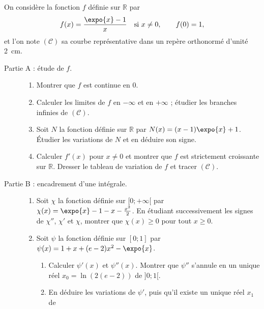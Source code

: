 \begin{exo}
\label{exo:pb exp moins un sur x}
      On consid\`ere la fonction $f$ d\'efinie sur $\mathbb{R}$ par
      \[
            f(x) = \frac{\expo{x} - 1}{x} \quad \text{si } x \neq 0, \qquad f(0) = 1 ,
      \]
      et l'on note $(\mathscr{C})$ sa courbe repr\'esentative dans un rep\`ere orthonorm\'e d'unit\'e 2~cm.
      \begin{description}
            \item[Partie A : \'etude de $f$.]
                  \begin{enumerate}
                        \item Montrer que $f$ est continue en $0$.
                        \item Calculer les limites de $f$ en $-\infty$ et en $+\infty$ ; \'etudier les branches infinies de $(\mathscr{C})$.
                        \item Soit $N$ la fonction d\'efinie sur $\mathbb{R}$ par $N(x) = (x - 1)\expo{x} + 1$.
                              \'Etudier les variations de $N$ et en d\'eduire son signe.
                        \item Calculer $f'(x)$ pour $x \neq 0$ et montrer que $f$ est strictement croissante sur $\mathbb{R}$.
                              Dresser le tableau de variation de $f$ et tracer $(\mathscr{C})$.
                  \end{enumerate}
            \item[Partie B : encadrement d'une int\'egrale.]
                  \begin{enumerate}
                        \item Soit $\chi$ la fonction d\'efinie sur $[0 ; +\infty[$ par $\chi(x) = \expo{x} - 1 - x - \frac{x^2}{2}$.
                              En \'etudiant successivement les signes de $\chi''$, $\chi'$ et $\chi$, montrer que
                              $\chi(x) \geq 0$ pour tout $x \geq 0$.
                        \item Soit $\psi$ la fonction d\'efinie sur $[0 ; 1]$ par $\psi(x) = 1 + x + (e-2)x^2 - \expo{x}$.
                              \begin{enumerate}
                                    \item Calculer $\psi'(x)$ et $\psi''(x)$. Montrer que $\psi''$ s'annule en un unique r\'eel
                                          $x_0 = \ln\left(2(e-2)\right)$ de $]0 ; 1[$.
                                    \item En d\'eduire les variations de $\psi'$, puis qu'il existe un unique r\'eel $x_1$ de

\end{enumerate}
\end{enumerate}
\end{description}
\end{exo}
